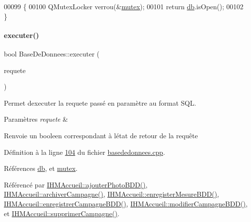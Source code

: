 \begin{DoxyCode}
00099 \{
00100     QMutexLocker verrou(&\hyperlink{class_base_de_donnees_aa1b4696fac87a740f914aa73739086f2}{mutex});
00101     \textcolor{keywordflow}{return} \hyperlink{class_base_de_donnees_a3e738dcf443370c46a541677ab619f06}{db}.isOpen();
00102 \}
\end{DoxyCode}
\mbox{\label{class_base_de_donnees_aa8de5f8f8bb17edc43f5c0ee33712081}} 
\paragraph{\texorpdfstring{executer()}{executer()}}
{\footnotesize\ttfamily bool Base\+De\+Donnees\+::executer (\begin{DoxyParamCaption}\item[{Q\+String}]{requete }\end{DoxyParamCaption})}



Permet d\textquotesingle{}executer la requete passé en paramètre au format S\+QL. 


\begin{DoxyParams}{Paramètres}
{\em requete} & \\
\hline
\end{DoxyParams}
\begin{DoxyReturn}{Renvoie}
un booleen correspondant à l\textquotesingle{}état de retour de la requête 
\end{DoxyReturn}


Définition à la ligne \hyperlink{basededonnees_8cpp_source_l00104}{104} du fichier \hyperlink{basededonnees_8cpp_source}{basededonnees.\+cpp}.



Références \hyperlink{basededonnees_8h_source_l00030}{db}, et \hyperlink{basededonnees_8h_source_l00031}{mutex}.



Référencé par \hyperlink{ihmaccueil_8cpp_source_l00313}{I\+H\+M\+Accueil\+::ajouter\+Photo\+B\+D\+D()}, \hyperlink{ihmaccueil_8cpp_source_l00350}{I\+H\+M\+Accueil\+::archiver\+Campagne()}, \hyperlink{ihmaccueil_8cpp_source_l00404}{I\+H\+M\+Accueil\+::enregister\+Mesure\+B\+D\+D()}, \hyperlink{ihmaccueil_8cpp_source_l00273}{I\+H\+M\+Accueil\+::enregistrer\+Campagne\+B\+D\+D()}, \hyperlink{ihmaccueil_8cpp_source_l00295}{I\+H\+M\+Accueil\+::modifier\+Campagne\+B\+D\+D()}, et \hyperlink{ihmaccueil_8cpp_source_l00375}{I\+H\+M\+Accueil\+::supprimer\+Campagne()}.


